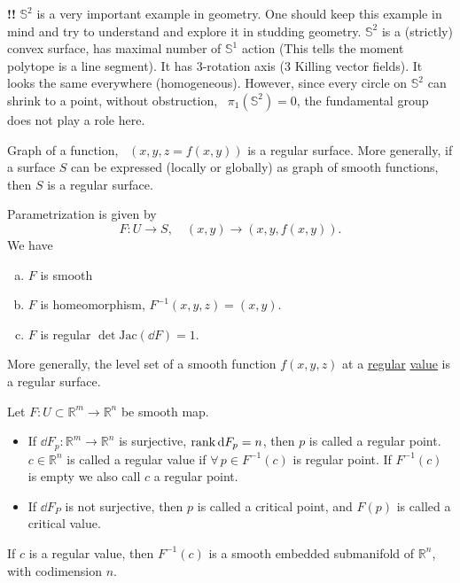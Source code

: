 \textbf{\color{red}!!} \(\mathbb{S}^2\) is a very important example in geometry. One
should keep this example in mind and try to understand and explore it in studding
geometry. \(\mathbb{S}^2\) is a (strictly) convex surface, has maximal number
of \(\mathbb{S}^1\) action (This tells the moment polytope is a line segment).
It has 3-rotation axis (3 Killing vector fields). It looks the same everywhere
(homogeneous). However, since every circle on \(\mathbb{S}^2\) can shrink to a point,
without obstruction, \ie\ \(\pi_1(\mathbb{S}^2)=0\), the fundamental group does not
play a role here.

\begin{example}\label{Graph of a function}
    Graph of a function, \ie\ \((x,y,z=f(x,y))\) is a regular surface. More
    generally, if a surface \(S\) can be expressed (locally or globally) as graph
    of smooth functions, then \(S\) is a regular surface.
\end{example}
Parametrization is given by \[
    F\colon U\to S,\quad (x,y)\to (x,y,f(x,y))
.\] We have 
\begin{enumerate}[(a)]
    \item \(F\) is smooth \checkmark{}
    \item \(F\) is homeomorphism, \(F^{-1}(x,y,z)=(x,y)\).
    \item \(F\) is regular \(\det\mathrm{Jac}(\dd{F})=1\).
\end{enumerate}

\begin{example}
    More generally, the level set of a smooth function \(f(x,y,z)\) at a
    \underline{regular} \underline{value} is a regular surface.
\end{example}

\begin{definition}
    Let \(F\colon U\subset \mathbb{R}^m\to \mathbb{R}^n\) be smooth map.
    \begin{itemize}
    \item If \(\dd{F_p}\colon\mathbb{R}^m\to \mathbb{R}^n\) is surjective, \ie 
        \(\rank\dd{F_p}=n\), then \(p\) is called a regular point. \(c\in
        \mathbb{R}^n\) is called a regular value if \(\forall\,p\in F^{-1}(c)\) is
        regular point. If \(F^{-1}(c)\) is empty we also call \(c\) a regular point.
    \item If \(\dd{F_P}\) is not surjective, then \(p\) is called a critical point,
        and \(F(p)\) is called a critical value.
    \end{itemize}
\end{definition}
\begin{remark}
    If \(c\) is a regular value, then \(F^{-1}(c)\) is a smooth embedded submanifold
    of \(\mathbb{R}^n\), with codimension \(n\).
\end{remark}

